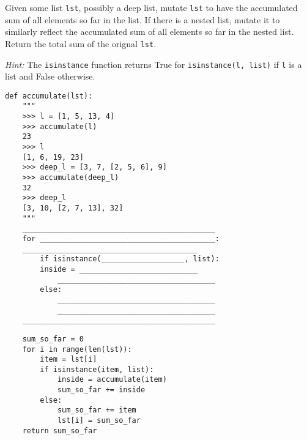 \question Given some list \texttt{lst}, possibly a deep list, mutate \texttt{lst} to have the accumulated sum of all elements so far in the list. If there is a nested list, mutate it to similarly reflect the accumulated sum of all elements so far in the nested list. Return the total sum of the orignal \texttt{lst}.

\emph{Hint:} The \lstinline$isinstance$ function returns True for \lstinline$isinstance(l, list)$ if \texttt{l} is a list and False otherwise.

\begin{lstlisting}
def accumulate(lst):
    """
    >>> l = [1, 5, 13, 4]
    >>> accumulate(l)
    23
    >>> l
    [1, 6, 19, 23]
    >>> deep_l = [3, 7, [2, 5, 6], 9]
    >>> accumulate(deep_l)
    32
    >>> deep_l
    [3, 10, [2, 7, 13], 32]
    """
    ____________________________________________
    for ________________________________________:
	________________________________________
        if isinstance(___________________, list):
	    inside = ___________________________
            ____________________________________
        else:
            ____________________________________
            ____________________________________
    ____________________________________________
\end{lstlisting}

\begin{solution}[1in]
\begin{lstlisting}
    sum_so_far = 0
    for i in range(len(lst)):
        item = lst[i]
        if isinstance(item, list):
            inside = accumulate(item)
            sum_so_far += inside
        else:
            sum_so_far += item
            lst[i] = sum_so_far
    return sum_so_far
\end{lstlisting}
\end{solution}
